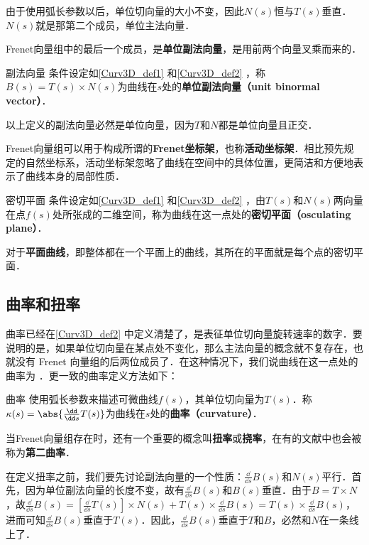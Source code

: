 由于使用弧长参数以后，单位切向量的大小不变，因此$N(s)$恒与$T(s)$垂直．$N(s)$就是那第二个成员，单位主法向量．

Frenet向量组中的最后一个成员，是\textbf{单位副法向量}，是用前两个向量叉乘而来的．

\begin{definition}{副法向量}
条件设定如\autoref{Curv3D_def1} 和\autoref{Curv3D_def2} ，称$B(s)=T(s)\times N(s)$为曲线在$s$处的\textbf{单位副法向量（unit binormal vector）}．
\end{definition}

以上定义的副法向量必然是单位向量，因为$T$和$N$都是单位向量且正交．

Frenet向量组可以用于构成所谓的\textbf{Frenet坐标架}，也称\textbf{活动坐标架}．相比预先规定的自然坐标系，活动坐标架忽略了曲线在空间中的具体位置，更简洁和方便地表示了曲线本身的局部性质．

\begin{definition}{密切平面}
条件设定如\autoref{Curv3D_def1} 和\autoref{Curv3D_def2} ，由$T(s)$和$N(s)$两向量在点$f(s)$处所张成的二维空间，称为曲线在这一点处的\textbf{密切平面（osculating plane）}．
\end{definition}

对于\textbf{平面曲线}，即整体都在一个平面上的曲线，其所在的平面就是每个点的密切平面．

\subsection{曲率和扭率}

曲率已经在\autoref{Curv3D_def2} 中定义清楚了，是表征单位切向量旋转速率的数字．要说明的是，如果单位切向量在某点处不变化，那么主法向量的概念就不复存在，也就没有 Frenet 向量组的后两位成员了．在这种情况下，我们说曲线在这一点处的曲率为 ．更一致的曲率定义方法如下：
\begin{definition}{曲率}
使用弧长参数来描述可微曲线$f(s)$，其单位切向量为$T(s)$．称$\kappa(s)=\abs{\frac{\dd}{\dd s}T(s)}$为曲线在$s$处的\textbf{曲率（curvature）}．
\end{definition}

当Frenet向量组存在时，还有一个重要的概念叫\textbf{扭率}或\textbf{挠率}，在有的文献中也会被称为\textbf{第二曲率}．

在定义扭率之前，我们要先讨论副法向量的一个性质：$\frac{\dd}{\dd s}B(s)$和$N(s)$平行．首先，因为单位副法向量的长度不变，故有$\frac{\dd}{\dd s}B(s)$和$B(s)$垂直．由于$B=T\times N$，故$\frac{\dd}{\dd s}B(s)=[\frac{\dd}{\dd s}T(s)]\times N(s)+T(s)\times\frac{\dd}{\dd s}B(s)=T(s)\times\frac{\dd}{\dd s}B(s)$，进而可知$\frac{\dd}{\dd s}B(s)$垂直于$T(s)$．因此，$\frac{\dd}{\dd s}B(s)$垂直于$T$和$B$，必然和$N$在一条线上了．

